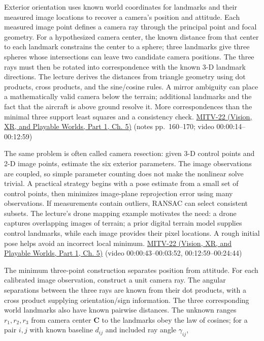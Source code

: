 \hypertarget{03-visual-computing-i-ch003-exterior-orientation-where-the-camera-stands-and-where-it-points}{}

Exterior orientation uses known world coordinates for landmarks and their measured image locations to recover a camera's position and attitude. Each measured image point defines a camera ray through the principal point and focal geometry. For a hypothesized camera center, the known distance from that center to each landmark constrains the center to a sphere; three landmarks give three spheres whose intersections can leave two candidate camera positions. The three rays must then be rotated into correspondence with the known 3-D landmark directions. The lecture derives the distances from triangle geometry using dot products, cross products, and the sine/cosine rules. A mirror ambiguity can place a mathematically valid camera below the terrain; additional landmarks and the fact that the aircraft is above ground resolve it. More correspondences than the minimal three support least squares and a consistency check. \href{../07-Vision-XR-and-Playable-Worlds-P01/main.pdf\#nameddest=04-visual-computing-ii-ch036-mitv-22---exterior-orientation-recovering-position-orientation-bundle-adjustment-object-shape}{MITV-22 (Vision, XR, and Playable Worlds, Part 1, Ch. 5)} (notes pp.~160--170; video 00:00:14--00:12:59)

The same problem is often called camera resection: given 3-D control points and 2-D image points, estimate the six exterior parameters. The image observations are coupled, so simple parameter counting does not make the nonlinear solve trivial. A practical strategy begins with a pose estimate from a small set of control points, then minimizes image-plane reprojection error using many observations. If measurements contain outliers, RANSAC can select consistent subsets. The lecture's drone mapping example motivates the need: a drone captures overlapping images of terrain; a prior digital terrain model supplies control landmarks, while each image provides their pixel locations. A rough initial pose helps avoid an incorrect local minimum. \href{../07-Vision-XR-and-Playable-Worlds-P01/main.pdf\#nameddest=04-visual-computing-ii-ch036-mitv-22---exterior-orientation-recovering-position-orientation-bundle-adjustment-object-shape}{MITV-22 (Vision, XR, and Playable Worlds, Part 1, Ch. 5)} (video 00:00:43--00:03:52, 00:12:59--00:24:44)

The minimum three-point construction separates position from attitude. For each calibrated image observation, construct a unit camera ray. The angular separations between the three rays are known from their dot products, with a cross product supplying orientation/sign information. The three corresponding world landmarks also have known pairwise distances. The unknown ranges \(r_1,r_2,r_3\) from camera center \(\mathbf C\) to the landmarks obey the law of cosines; for a pair \(i,j\) with known baseline \(d_{ij}\) and included ray angle \(\gamma_{ij}\),


